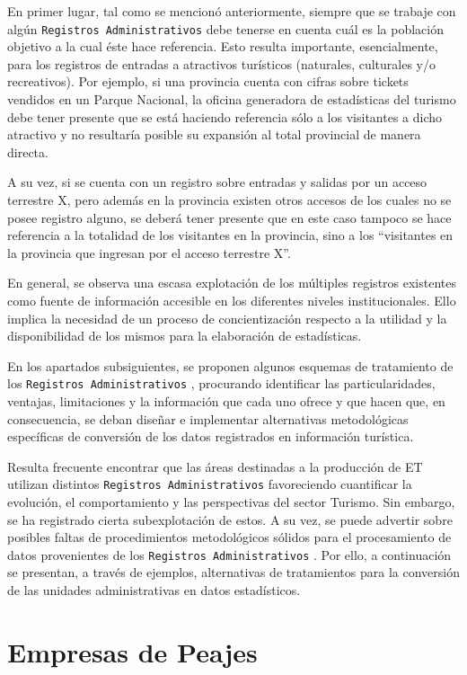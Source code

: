 \documentclass[
]{book}
\begin{document}
En primer lugar, tal como se mencionó anteriormente, siempre que se trabaje con algún \texttt{Registros\ Administrativos} debe tenerse en cuenta cuál es la población objetivo a la cual éste hace referencia. Esto resulta importante, esencialmente, para los registros de entradas a atractivos turísticos (naturales, culturales y/o recreativos). Por ejemplo, si una provincia cuenta con cifras sobre tickets vendidos en un Parque Nacional, la oficina generadora de estadísticas del turismo debe tener presente que se está haciendo referencia sólo a los visitantes a dicho atractivo y no resultaría posible su expansión al total provincial de manera directa.

A su vez, si se cuenta con un registro sobre entradas y salidas por un acceso terrestre X, pero además en la provincia existen otros accesos de los cuales no se posee registro alguno, se deberá tener presente que en este caso tampoco se hace referencia a la totalidad de los visitantes en la provincia, sino a los ``visitantes en la provincia que ingresan por el acceso terrestre X''.

En general, se observa una escasa explotación de los múltiples registros existentes como fuente de información accesible en los diferentes niveles institucionales. Ello implica la necesidad de un proceso de concientización respecto a la utilidad y la disponibilidad de los mismos para la elaboración de estadísticas.

En los apartados subsiguientes, se proponen algunos esquemas de tratamiento de los \texttt{Registros\ Administrativos} , procurando identificar las particularidades, ventajas, limitaciones y la información que cada uno ofrece y que hacen que, en consecuencia, se deban diseñar e implementar alternativas metodológicas específicas de conversión de los datos registrados en información turística.

Resulta frecuente encontrar que las áreas destinadas a la producción de ET utilizan distintos \texttt{Registros\ Administrativos} favoreciendo cuantificar la evolución, el comportamiento y las perspectivas del sector Turismo. Sin embargo, se ha registrado cierta subexplotación de estos. A su vez, se puede advertir sobre posibles faltas de procedimientos metodológicos sólidos para el procesamiento de datos provenientes de los \texttt{Registros\ Administrativos} . Por ello, a continuación se presentan, a través de ejemplos, alternativas de tratamientos para la conversión de las unidades administrativas en datos estadísticos.

\hypertarget{empresas-de-peajes}{%
\section{Empresas de Peajes}\label{empresas-de-peajes}}
\end{document}
